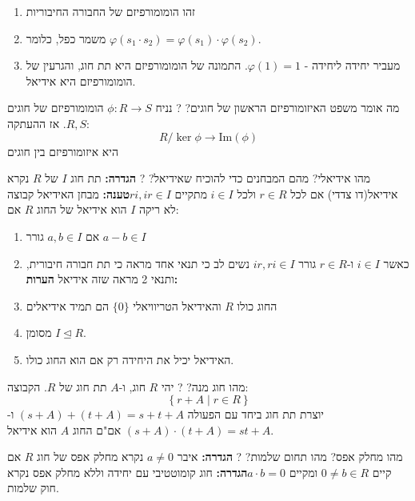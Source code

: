 \documentclass{tstextbook}
\begin{document}
\begin{enumerate}
  \item זהו הומומורפיזם של החבורה החיבוריות 


  \item משמר כפל, כלומר \(\varphi\left( s_{1}\cdot s_{2} \right)=\varphi(s_{1})\cdot \varphi(s_{2})\). 


  \item מעביר יחידה ליחידה - \(\varphi(1)=1\). 
התמונה של הומומורפיזם היא תת חוג, והגרעין של הומומורפיזם היא אידיאל.


\end{enumerate}
מה אומר משפט האיזומורפיזם הראשון של חוגים?
?
נניח \(\phi:R\to S\) הומומורפיזם של חוגים \(R,S\). אז ההעתקה:
$$R / \ker \phi \to \mathrm{Im}\left( \phi \right)$$
היא איזומורפיזם בין חוגים

מהו אידיאלי? מהם המבחנים כדי להוכיח שאידיאל?
?
\textbf{הגדרה:} תת חוג \(I\) של \(R\) נקרא אידיאל(דו צדדי) אם לכל \(r\in R\) ולכל \(i \in I\) מתקיים \(ri,ir\in I\)\textbf{טענה:} מבחן האידיאל
קבוצה לא ריקה \(I\) הוא אידיאל של החוג \(R\) אם:

\begin{enumerate}
  \item אם \(a,b \in I\) גורר \(a-b\in I\)


  \item כאשר \(i \in I\) ו-\(r \in R\) גורר \(ir,ri \in I\) 
נשים לב כי תנאי אחד מראה כי תת חבורה חיבורית, ותנאי 2 מראה שזה אידיאל
\textbf{הערות:}


  \item החוג כולו \(R\) והאידיאל הטריוויאלי \(\{ 0 \}\) הם תמיד אידיאלים 


  \item מסומן \(I\trianglelefteq R\). 


  \item האידיאל יכיל את היחידה רק אם הוא החוג כולו. 


\end{enumerate}
מהו חוג מנה?
?
יהי \(R\) חוג, ו-\(A\) תת חוג של \(R\). הקבוצה:
$$\left\{  r+A\mid r\in R  \right\}$$
יוצרת תת חוג ביחד עם הפעולה \((s+A)+(t+A)=s+t+A\) ו-\((s+A)\cdot(t+A)=st+A\) אם"ם החוג \(A\) הוא אידיאל.

מהו מחלק אפס? מהו תחום שלמות?
?
\textbf{הגדרה:} איבר \(a\neq 0\) נקרא מחלק אפס של חוג \(R\) אם קיים \(0\neq b \in R\) ומקיים \(a\cdot b =0\)\textbf{הגדרה:} חוג קומוטטיבי עם יחידה וללא מחלק אפס נקרא חוק שלמות.
\end{document}

